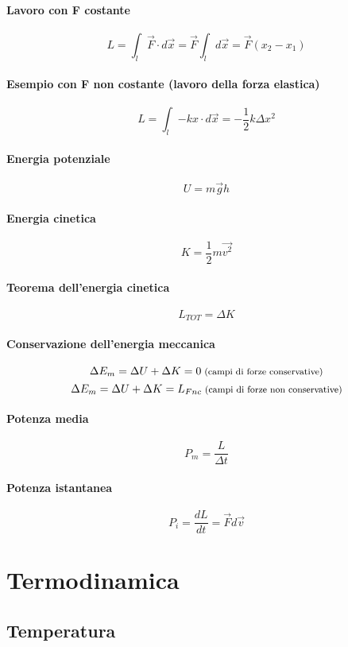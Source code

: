 \documentclass[12pt]{article}
\begin{document}
            \paragraph*{Lavoro con F costante}
            \[L = \int_{l}{\vec{F} \cdot d \vec{x}} = \vec{F}\int_{l}{ d \vec{x}} = \vec{F}(x_2 - x_1)\]
            \paragraph*{Esempio con F non costante (lavoro della forza elastica)}
            \[L = \int_{l}{-k x \cdot d \vec{x}} = -\frac{1}{2}k\Delta x^2\]
            \paragraph*{Energia potenziale}
            \[U = m\vec{g}h\]
            \paragraph*{Energia cinetica}
            \[K = \frac{1}{2}m\vec{v^2}\]
            \paragraph*{Teorema dell'energia cinetica}
            \[L_{TOT} = \Delta K\]
            \paragraph*{Conservazione dell'energia meccanica}
            \[\Delta E_m = \Delta U + \Delta K = 0 \text{\footnotesize{ (campi di forze conservative)}} \]
            \[\Delta E_m = \Delta U + \Delta K = L_{Fnc} \text{\footnotesize{ (campi di forze non conservative)}} \]
            \paragraph*{Potenza media}
            \[P_m = \frac{L}{\Delta t}\]
            \paragraph*{Potenza istantanea}
            \[P_i = \frac{dL}{dt} = \vec{F}d\vec{v}\]
\section{Termodinamica}
    \subsection{Temperatura}
\end{document}
